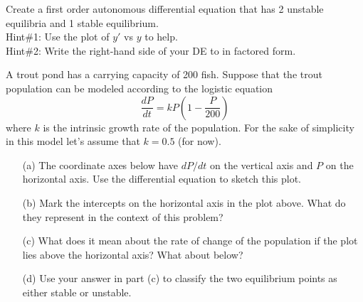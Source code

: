 \begin{problem}
    Create a first order autonomous differential equation that has 2 unstable equilibria
    and 1 stable equilibrium.\\
    Hint\#1: Use the plot of $y'$ vs $y$ to help.\\
    Hint\#2: Write the right-hand side of your DE to in factored form.
\end{problem}


\begin{problem}
    A trout pond has a carrying capacity of 200 fish.  Suppose that the trout population
    can be modeled according to the logistic equation
    \[ \frac{dP}{dt} = kP\left( 1-\frac{P}{200} \right) \]
    where $k$ is the intrinsic growth rate of the population.  For the sake of simplicity
    in this model let's assume that $k = 0.5$ (for now).  
    \begin{enumerate}
        \item[(a)] The coordinate axes below have $dP/dt$ on the vertical axis and $P$ on
            the horizontal axis.  Use the differential equation to sketch this plot.
            \begin{center}
            \end{center}
        \item[(b)] Mark the intercepts on the horizontal axis in the plot above.  What do
            they represent in the context of this problem?
        \item[(c)] What does it mean about the rate of change of the population if  the
            plot lies above the horizontal axis?  What about below?
        \item[(d)] Use your answer in part (c) to classify the two equilibrium points as
            either stable or unstable.
    \end{enumerate}
\end{problem}



